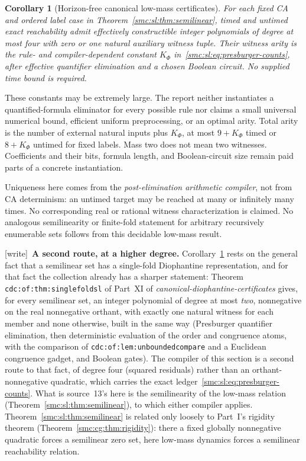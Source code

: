 \documentclass[11pt,letterpaper]{article}
\numberwithin{equation}{section}
\newtheorem{corollary}[theorem]{Corollary}
\theoremstyle{definition}
\theoremstyle{remark}
\newcommand{\wtag}{\textup{[write]}}
\begin{document}
\begin{corollary}[Horizon-free canonical low-mass certificates]\label{smc:sl:cor:fixedarity}
For each fixed CA and ordered label case in Theorem~\ref{smc:sl:thm:semilinear}, timed and untimed exact reachability admit effectively constructible integer polynomials of degree at most four with zero or one natural auxiliary witness tuple. Their witness arity is the rule- and compiler-dependent constant $K_\Phi$ in~\eqref{smc:sl:eq:presburger-counts}, after effective quantifier elimination and a chosen Boolean circuit. No supplied time bound is required.
\end{corollary}
These constants may be extremely large. The report neither instantiates a quantified-formula eliminator for every possible rule nor claims a small universal numerical bound, efficient uniform preprocessing, or an optimal arity. Total arity is the number of external natural inputs plus $K_\Phi$, at most $9+K_\Phi$ timed or $8+K_\Phi$ untimed for fixed labels. Mass two does not mean two witnesses. Coefficients and their bits, formula length, and Boolean-circuit size remain paid parts of a concrete instantiation.

Uniqueness here comes from the \emph{post-elimination arithmetic compiler}, not from CA determinism: an untimed target may be reached at many or infinitely many times. No corresponding real or rational witness characterization is claimed. No analogous semilinearity or finite-fold statement for arbitrary recursively enumerable sets follows from this decidable low-mass result.

\wtag\ \textbf{A second route, at a higher degree.} Corollary~\ref{smc:sl:cor:fixedarity} rests on the general fact that a semilinear set has a single-fold Diophantine representation, and for that fact the collection already has a sharper statement: Theorem \texttt{cdc:of:thm:singlefoldsl} of Part~XI of \emph{canonical-diophantine-certificates} gives, for every semilinear set, an integer polynomial of degree at most \emph{two}, nonnegative on the real nonnegative orthant, with exactly one natural witness for each member and none otherwise, built in the same way (Presburger quantifier elimination, then deterministic evaluation of the order and congruence atoms, with the comparison of \texttt{cdc:of:lem:unboundedcompare} and a Euclidean congruence gadget, and Boolean gates). The compiler of this section is a second route to that fact, of degree four (squared residuals) rather than an orthant-nonnegative quadratic, which carries the exact ledger~\eqref{smc:sl:eq:presburger-counts}. What is source~13's here is the semilinearity of the low-mass relation (Theorem~\ref{smc:sl:thm:semilinear}), to which either compiler applies. Theorem~\ref{smc:sl:thm:semilinear} is related only loosely to Part~I's rigidity theorem (Theorem~\ref{smc:cg:thm:rigidity}): there a fixed globally nonnegative quadratic forces a semilinear zero set, here low-mass dynamics forces a semilinear reachability relation.
\end{document}

